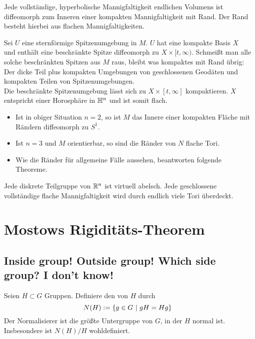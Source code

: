 \documentclass{book}
\begin{document}
\Kor{}
Jede vollständige, hyperbolische Mannigfaltigkeit endlichen Volumens ist diffeomorph zum Inneren einer kompakten Mannigfaltigkeit mit Rand. Der Rand besteht hierbei aus flachen Mannigfaltigkeiten.
\begin{Beweis}{}
	Sei $U$ eine sternförmige Spitzenumgebung in $M$. $U$ hat eine kompakte Basis $X$ und enthält eine beschränkte Spitze diffeomorph zu $X \times [t, \infty)$. Schmeißt man alle solche beschränkten Spitzen aus $M$ raus, bleibt was kompaktes mit Rand übrig: Der dicke Teil plus kompakten Umgebungen von geschlossenen Geodäten und kompakten Teilen von Spitzenumgebungen.\\
	Die beschränkte Spitzenumgebung lässt sich zu $X\times [t,\infty]$ kompaktieren. $X$ entspricht einer Horosphäre in $\mathbb{H}^n$ und ist somit flach.
\end{Beweis}

\Bem{}
\begin{itemize}
	\item Ist in obiger Situation $n = 2$, so ist $M$ das Innere einer kompakten Fläche mit Rändern diffeomorph zu $S^1$.
	\item Ist $n = 3$ und $M$ orientierbar, so sind die Ränder von $N$ flache Tori.
	\item Wie die Ränder für allgemeine Fälle aussehen, beantworten folgende Theoreme.
\end{itemize}

\Satz{}
Jede diskrete Teilgruppe von $\mathbb{R}^n$ ist virtuell abelsch.
Jede geschlossene vollständige flache Mannigfaltigkeit wird durch endlich viele Tori überdeckt.

\chapter{Mostows Rigiditäts-Theorem}
\section{Inside group! Outside group! Which side group? I don't know!}
\Def{}
Seien $H\subset G$ Gruppen. Definiere den  von $H$ durch
\[ N(H) := \set{g \in G}{ gH = Hg } \]
Der Normalisierer ist die größte Untergruppe von $G$, in der $H$ normal ist. Insbesondere ist $N(H) /H$ wohldefiniert.
\end{document}
